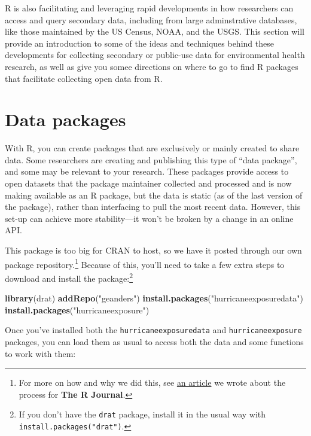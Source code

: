 \documentclass[]{tufte-book}
\newenvironment{Shaded}{}{}
\newcommand{\KeywordTok}[1]{\textcolor[rgb]{0.00,0.44,0.13}{\textbf{#1}}}
\newcommand{\NormalTok}[1]{#1}
\newcommand{\StringTok}[1]{\textcolor[rgb]{0.25,0.44,0.63}{#1}}
\begin{document}
R is also facilitating and leveraging rapid developments in how researchers can access and
query secondary data, including from large adminstrative databases, like those maintained
by the US Census, NOAA, and the USGS. This section will provide an
introduction to some of the ideas and techniques behind these developments for
collecting secondary or public-use data for environmental health research, as well as
give you somee directions on where to go to find R packages that facilitate collecting
open data from R.

\hypertarget{data-packages}{%
\section{Data packages}\label{data-packages}}

With R, you can create packages that are exclusively or mainly created to share data.
Some researchers are creating and publishing this type of ``data package'', and some
may be relevant to your research. These packages provide access to open datasets that the
package maintainer collected and processed and is now making available as an R package,
but the data is static (as of the last version of the package), rather than interfacing
to pull the most recent data. However, this set-up can achieve more stability---it won't
be broken by a change in an online API.

This package is too big for CRAN to host, so we have it posted through our own package
repository.\footnote{For more on how and why we did this, see
  \href{https://journal.r-project.org/archive/2017/RJ-2017-026/}{an article} we wrote about the
  process for \textbf{The R Journal}.} Because of this, you'll need to take a few extra steps
to download and install the package:\footnote{If you don't have the \texttt{drat} package, install it in
  the usual way with \texttt{install.packages("drat")}.}

\begin{Shaded}
\begin{Highlighting}[]
\KeywordTok{library}\NormalTok{(drat)}
\KeywordTok{addRepo}\NormalTok{(}\StringTok{"geanders"}\NormalTok{)}
\KeywordTok{install.packages}\NormalTok{(}\StringTok{"hurricaneexposuredata"}\NormalTok{)}
\KeywordTok{install.packages}\NormalTok{(}\StringTok{"hurricaneexposure"}\NormalTok{)}
\end{Highlighting}
\end{Shaded}

Once you've installed both the \texttt{hurricaneexposuredata} and \texttt{hurricaneexposure} packages, you
can load them as usual to access both the data and some functions to work with them:
\end{document}
